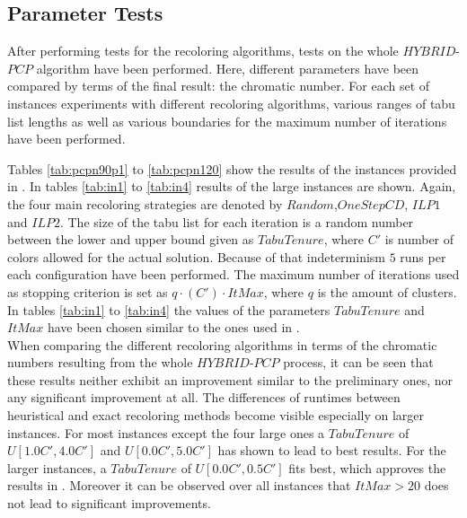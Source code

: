 \subsection{Parameter Tests}
After performing tests for the recoloring algorithms, tests on the whole $\mathit{HYBRID}$-$\mathit{PCP}$ algorithm have been performed. Here, different parameters have been compared by terms of the final result: the chromatic number. For each set of instances experiments with different recoloring algorithms, various ranges of tabu list lengths as well as various boundaries for the maximum number of iterations have been performed. 

Tables \ref{tab:pcpn90p1} to \ref{tab:pcpn120} show the results of the instances provided in \cite{frota-07}. In tables \ref{tab:in1} to \ref{tab:in4} results of the large instances are shown. Again, the four main recoloring strategies are denoted by $\mathit{Random}$,$\mathit{OneStepCD}$, $\mathit{ILP1}$ and $\mathit{ILP2}$. The size of the tabu list for each iteration is a random number between the lower and upper bound given as $TabuTenure$, where $C'$ is number of colors allowed for the actual solution. Because of that indeterminism $5$ runs per each configuration have been performed. The maximum number of iterations used as stopping criterion is set as $q\cdot (C')\cdot ItMax$, where $q$ is the amount of clusters. In tables \ref{tab:in1} to \ref{tab:in4} the values of the parameters $TabuTenure$ and $ItMax$ have been chosen similar to the ones used in \cite{noronha-06}.\\

When comparing the different recoloring algorithms in terms of the chromatic numbers resulting from the whole $\mathit{HYBRID}$-$\mathit{PCP}$ process, it can be seen that these results neither exhibit an improvement similar to the preliminary ones, nor any significant improvement at all. The differences of runtimes between heuristical and exact recoloring methods become visible especially on larger instances. For most instances except the four large ones a $TabuTenure$ of $U[1.0C',4.0C']$ and $U[0.0C',5.0C']$ has shown to lead to best results. For the larger instances, a $TabuTenure$ of $U[0.0C',0.5C']$ fits best, which approves the results in \cite{noronha-06}. Moreover it can be observed over all instances that $ItMax > 20$ does not lead to significant improvements.

